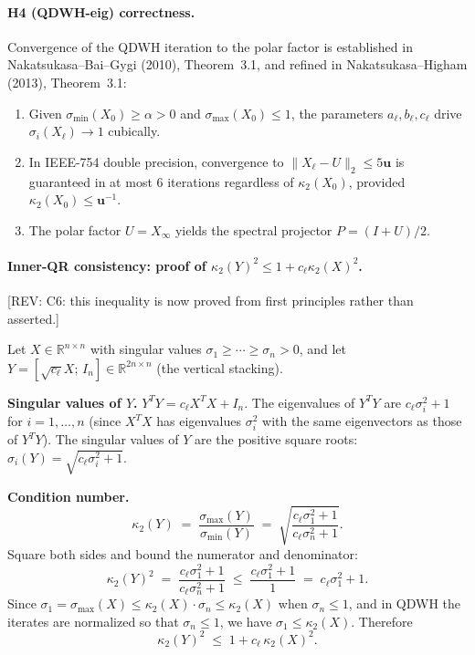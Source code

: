 \documentclass[11pt]{article}
\newcommand{\REV}[1]{\textcolor{blue!60!black}{\small\textsf{[REV: #1]}}}
\begin{document}
\paragraph{H4 (QDWH-eig) correctness.}
Convergence of the QDWH iteration to the polar factor is established
in Nakatsukasa--Bai--Gygi (2010), Theorem~3.1, and refined in
Nakatsukasa--Higham (2013), Theorem~3.1:
\begin{enumerate}[leftmargin=2em]
  \item Given $\sigma_{\min}(X_0) \ge \alpha > 0$ and
    $\sigma_{\max}(X_0) \le 1$, the parameters $a_\ell, b_\ell, c_\ell$
    drive $\sigma_i(X_\ell) \to 1$ cubically.
  \item In IEEE-754 double precision, convergence to
    $\|X_\ell - U\|_2 \le 5\mathbf{u}$ is guaranteed in at most $6$
    iterations regardless of $\kappa_2(X_0)$, provided
    $\kappa_2(X_0) \le \mathbf{u}^{-1}$.
  \item The polar factor $U = X_\infty$ yields the spectral projector
    $P = (I + U)/2$.
\end{enumerate}

\paragraph{Inner-QR consistency: proof of $\kappa_2(Y)^2 \le 1 + c_\ell \kappa_2(X)^2$.}
\label{sec:C3}
\REV{C6: this inequality is now proved from first principles rather
than asserted.}

Let $X \in \mathbb{R}^{n \times n}$ with singular values
$\sigma_1 \ge \cdots \ge \sigma_n > 0$, and let
$Y = [\sqrt{c_\ell} X;\, I_n] \in \mathbb{R}^{2n \times n}$ (the
vertical stacking).

\textbf{Singular values of $Y$.}
$Y^T Y = c_\ell X^T X + I_n$. The eigenvalues of $Y^T Y$ are
$c_\ell \sigma_i^2 + 1$ for $i = 1,\ldots,n$ (since $X^T X$ has
eigenvalues $\sigma_i^2$ with the same eigenvectors as those of $Y^T Y$).
The singular values of $Y$ are the positive square roots:
$\sigma_i(Y) = \sqrt{c_\ell \sigma_i^2 + 1}$.

\textbf{Condition number.}
\[
  \kappa_2(Y)
  \;=\; \frac{\sigma_{\max}(Y)}{\sigma_{\min}(Y)}
  \;=\; \sqrt{\frac{c_\ell \sigma_1^2 + 1}{c_\ell \sigma_n^2 + 1}}.
\]
Square both sides and bound the numerator and denominator:
\[
  \kappa_2(Y)^2
  \;=\; \frac{c_\ell \sigma_1^2 + 1}{c_\ell \sigma_n^2 + 1}
  \;\le\; \frac{c_\ell \sigma_1^2 + 1}{1}
  \;=\; c_\ell \sigma_1^2 + 1.
\]
Since $\sigma_1 = \sigma_{\max}(X) \le \kappa_2(X) \cdot \sigma_n
\le \kappa_2(X)$ when $\sigma_n \le 1$, and in QDWH the iterates are
normalized so that $\sigma_n \le 1$, we have $\sigma_1 \le \kappa_2(X)$.
Therefore
\[
  \boxed{\;
  \kappa_2(Y)^2 \;\le\; 1 + c_\ell\,\kappa_2(X)^2.
  \;}
\]
\end{document}
